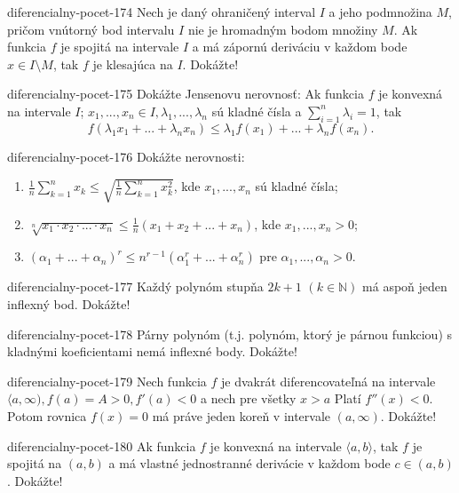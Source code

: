 \begin{defproblem}{diferencialny-pocet-174}
Nech je daný ohraničený interval $I$ a jeho podmnožina $M$, pričom vnútorný bod intervalu $I$ nie je hromadným bodom množiny $M$. Ak funkcia $f$ je spojitá na intervale $I$ a má zápornú deriváciu v každom bode $x\in I\setminus M$, tak $f$ je klesajúca na $I$. Dokážte!
\end{defproblem}

\begin{defproblem}{diferencialny-pocet-175}
Dokážte Jensenovu nerovnosť: Ak funkcia $f$ je konvexná na intervale $I$; $x_1,...,x_n\in I,\lambda_1,...,\lambda_n$ sú kladné čísla a $\sum_{i=1}^n \lambda_i=1$, tak
$$f(\lambda_1x_1+...+\lambda_nx_n)\leq \lambda_1f(x_1)+...+\lambda_nf(x_n).$$
\end{defproblem}

\begin{defproblem}{diferencialny-pocet-176}
Dokážte nerovnosti:
\begin{enumerate}
\item $\frac{1}{n}\sum_{k=1}^n x_k\leq \sqrt{\frac{1}{n}\sum_{k=1}^n x^2_{k}}$, kde $x_1,...,x_n$ sú kladné čísla;
\item $\sqrt[n]{x_1\cdot x_2\cdot...\cdot x_n}\leq \frac{1}{n}(x_1+x_2+...+x_n)$, kde $x_1,...,x_n>0$;
\item $(\alpha_1+...+\alpha_n)^r\leq n^{r-1}(\alpha^r_1+...+\alpha^r_n)$ pre $\alpha_1,...,\alpha_n>0$.
\end{enumerate}
\end{defproblem}

\begin{defproblem}{diferencialny-pocet-177}
Každý polynóm stupňa $2k+1$ $(k\in\mathbb{N})$ má aspoň jeden inflexný bod. Dokážte!
\end{defproblem}

\begin{defproblem}{diferencialny-pocet-178}
Párny polynóm (t.j. polynóm, ktorý je párnou funkciou) s kladnými koeficientami nemá inflexné body. Dokážte!
\end{defproblem}

\begin{defproblem}{diferencialny-pocet-179}
Nech funkcia $f$ je dvakrát diferencovateľná na intervale $\langle a,\infty),f(a)=A>0,f'(a)<0$ a nech pre všetky $x>a$ Platí $f''(x)<0$. Potom rovnica $f(x)=0$ má práve jeden koreň v intervale $(a,\infty)$. Dokážte!
\end{defproblem}

\begin{defproblem}{diferencialny-pocet-180}
Ak funkcia $f$ je konvexná na intervale $\langle a,b \rangle$, tak $f$ je spojitá na $(a,b)$ a má vlastné jednostranné derivácie v každom bode $c\in (a,b)$. Dokážte!
\end{defproblem}

